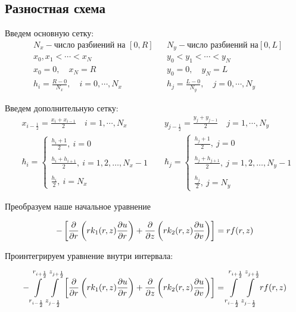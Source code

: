 \subsection{Разностная схема}
Введем основную сетку:
\begin{align*}
  &N_x - \text{число разбиений на } [0, R] & &N_y - \text{число разбиений на} [0, L] \\
  &x_0, x_1 < \cdots < x_N & &y_0 < y_1 < \cdots < y_N \\
  &x_0 = 0,\quad x_N = R & &y_0 = 0,\quad y_N = L \\
  &h_i = \frac{R - 0}{N_x},\quad i=0,\cdots, N_x & &h_j = \frac{L - 0}{N_y},\quad j=0,\cdots, N_y 
\end{align*}

Введем дополнительную сетку:
\begin{align*}
  &x_{i-\frac{1}{2}} = \frac{x_i + x_{i - 1}}{2}\quad i=1,\cdots, N_x & &y_{j-\frac{1}{2}} = \frac{y_j + y_{j - 1}}{2}\quad j=1,\cdots, N_y \\
  &  \hbar_i = \begin{cases}
    \frac{h_i + 1}{2},\ i = 0 \\ \\
    \frac{h_i + h_{i+1}}{2},\ i = 1, 2, \dots, N_x-1 \\ \\
    \frac{h_i}{2},\ i = N_x
  \end{cases} &
  &   \hbar_j = \begin{cases}
    \frac{h_j + 1}{2},\ j = 0 \\ \\
    \frac{h_j + h_{j+1}}{2},\ j = 1, 2, \dots, N_y-1 \\ \\
    \frac{h_j}{2},\ j = N_y
  \end{cases}
\end{align*}

Преобразуем наше начальное уравнение

\[
  - \left [ \pdv{}{r} \left ( r k_1(r, z) \pdv{u}{r} \right ) 
  + \pdv{}{z} \left ( rk_2(r, z)\pdv{u}{v} \right ) \right ] = rf(r, z)
\]

Проинтегрируем уравнение внутри интервала:

\[
  - \int\limits^{r_{i +\frac{1}{2}}}_{r_{i -\frac{1}{2}}} \int\limits^{z_{j +\frac{1}{2}}}_{z_{j -\frac{1}{2}}} \left [ \pdv{}{r} \left ( r k_1(r, z) \pdv{u}{r} \right ) 
  + \pdv{}{z} \left ( rk_2(r, z)\pdv{u}{v} \right ) \right ] = \int\limits^{r_{i +\frac{1}{2}}}_{r_{i -\frac{1}{2}}} \int\limits^{z_{j +\frac{1}{2}}}_{z_{j -\frac{1}{2}}} rf(r, z)
\]

